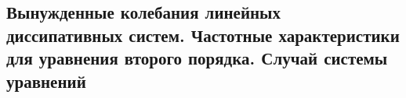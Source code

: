 

\subsection{Вынужденные колебания линейных диссипативных систем. Частотные характеристики для уравнения второго порядка. Случай системы уравнений}



